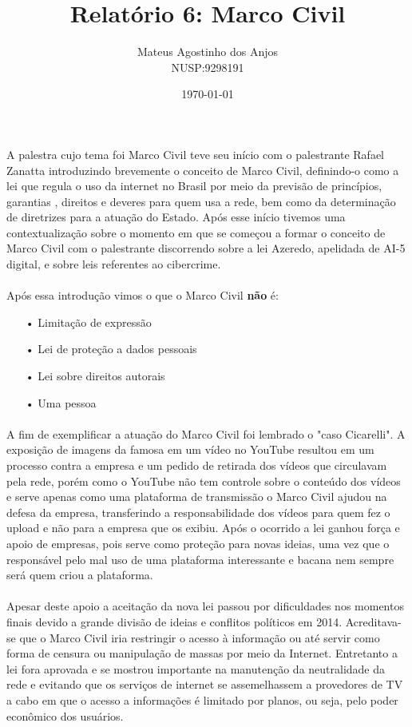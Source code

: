 \documentclass[12pt]{article}
\title{Relatório 6: Marco Civil}
\author{Mateus Agostinho dos Anjos\\NUSP:9298191}
\date{\today}
\begin{document}
	\maketitle
		\paragraph{}
			A palestra cujo tema foi Marco Civil teve seu início com o palestrante
			Rafael Zanatta introduzindo brevemente o conceito de Marco Civil, 
			definindo-o como a lei que regula o uso da internet no Brasil por meio da
			previsão de princípios, garantias , direitos e deveres para quem usa a rede,
			bem como da determinação de diretrizes para a atuação do Estado. Após 
			esse início tivemos uma contextualização sobre o momento em que se
			começou a formar o conceito de Marco Civil com o palestrante discorrendo
			sobre a lei Azeredo, apelidada  de AI-5 digital, e sobre leis referentes ao
			cibercrime.
		\paragraph{}
			Após essa introdução vimos o que o Marco Civil \textbf{não} é:
			\begin{itemize}
				\item[•]
					Limitação de expressão
				\item[•]
					Lei de proteção a dados pessoais
				\item[•]
					Lei sobre direitos autorais	
				\item[•]
					Uma pessoa	
			\end{itemize}	
		\paragraph{}
			A fim de exemplificar a atuação do Marco Civil foi lembrado
			o "caso Cicarelli". A exposição de imagens da famosa em um vídeo no 
			YouTube resultou em um processo contra a empresa e um pedido de
			retirada dos vídeos que circulavam pela rede, porém como o YouTube
			não tem controle sobre o conteúdo dos vídeos e serve apenas como uma
			plataforma de transmissão o Marco Civil ajudou na defesa da empresa, 
			transferindo a responsabilidade dos vídeos para quem fez o upload e não
			para a empresa que os exibiu. Após o ocorrido a lei ganhou força e apoio
			de empresas, pois serve como proteção para novas ideias, uma vez que
			o responsável pelo mal uso de uma plataforma interessante e bacana nem
			sempre será quem criou a plataforma. 
		\paragraph{}
			Apesar deste apoio a aceitação da nova lei passou por dificuldades nos 
			momentos finais devido a grande divisão de ideias e conflitos políticos
			em 2014. Acreditava-se que o Marco Civil iria restringir o acesso à
			informação ou até servir como forma de censura ou manipulação de massas
			por meio da Internet. Entretanto a lei fora aprovada e se mostrou
			importante na manutenção da neutralidade da rede e evitando que
			os serviços de internet se assemelhassem a provedores de TV a cabo em que
			o acesso a informações é limitado por planos, ou seja, pelo poder econômico
			dos usuários.
\end{document}
